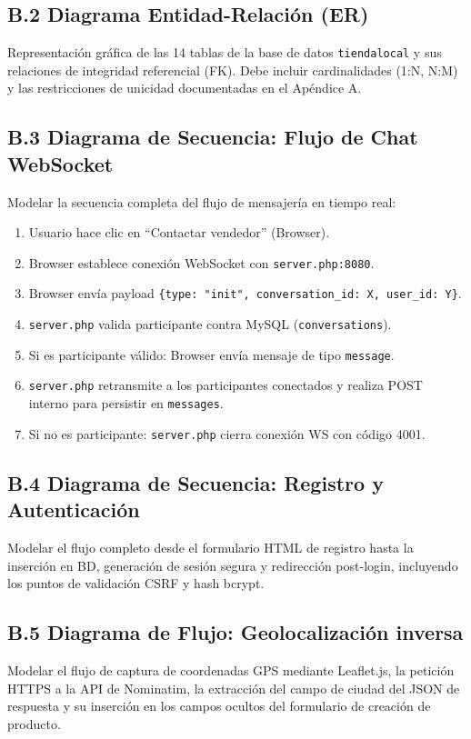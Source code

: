 \documentclass[11pt,a4paper]{report}
\begin{document}
\subsection{B.2 Diagrama Entidad-Relación (ER)}
Representación gráfica de las 14 tablas de la base de datos \texttt{tiendalocal} y sus relaciones de integridad referencial (FK). Debe incluir cardinalidades (1:N, N:M) y las restricciones de unicidad documentadas en el Apéndice A.

\subsection{B.3 Diagrama de Secuencia: Flujo de Chat WebSocket}
Modelar la secuencia completa del flujo de mensajería en tiempo real:
\begin{enumerate}
    \item Usuario hace clic en ``Contactar vendedor'' (Browser).
    \item Browser establece conexión WebSocket con \texttt{server.php:8080}.
    \item Browser envía payload \texttt{\{type: "init", conversation\_id: X, user\_id: Y\}}.
    \item \texttt{server.php} valida participante contra MySQL (\texttt{conversations}).
    \item Si es participante válido: Browser envía mensaje de tipo \texttt{message}.
    \item \texttt{server.php} retransmite a los participantes conectados y realiza POST interno para persistir en \texttt{messages}.
    \item Si no es participante: \texttt{server.php} cierra conexión WS con código 4001.
\end{enumerate}

\subsection{B.4 Diagrama de Secuencia: Registro y Autenticación}
Modelar el flujo completo desde el formulario HTML de registro hasta la inserción en BD, generación de sesión segura y redirección post-login, incluyendo los puntos de validación CSRF y hash bcrypt.

\subsection{B.5 Diagrama de Flujo: Geolocalización inversa}
Modelar el flujo de captura de coordenadas GPS mediante Leaflet.js, la petición HTTPS a la API de Nominatim, la extracción del campo de ciudad del JSON de respuesta y su inserción en los campos ocultos del formulario de creación de producto.
\end{document}
